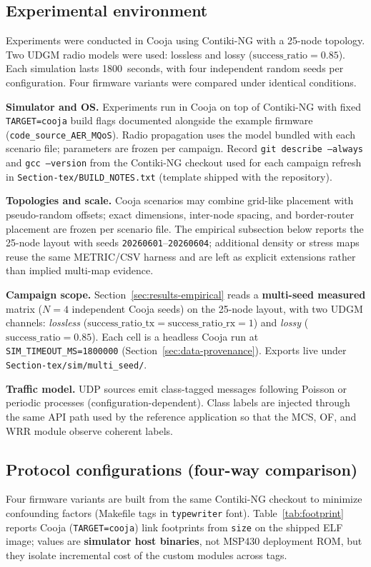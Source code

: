 \subsection{Experimental environment}
Experiments were conducted in Cooja using Contiki-NG with a 25-node topology. Two UDGM radio models were used: lossless and lossy ($\mathrm{success\_ratio}{=}0.85$). Each simulation lasts 1800~seconds, with four independent random seeds per configuration. Four firmware variants were compared under identical conditions.

\textbf{Simulator and OS.} Experiments run in Cooja on top of Contiki-NG with fixed \texttt{TARGET=cooja} build flags documented alongside the example firmware (\texttt{code\_source\_AER\_MQoS}). Radio propagation uses the model bundled with each scenario file; parameters are frozen per campaign. Record \texttt{git describe --always} and \texttt{gcc --version} from the Contiki-NG checkout used for each campaign refresh in \texttt{Section-tex/BUILD\_NOTES.txt} (template shipped with the repository).

\textbf{Topologies and scale.} Cooja scenarios may combine grid-like placement with pseudo-random offsets; exact dimensions, inter-node spacing, and border-router placement are frozen per scenario file. The empirical subsection below reports the 25-node layout with seeds \texttt{20260601}--\texttt{20260604}; additional density or stress maps reuse the same METRIC/CSV harness and are left as explicit extensions rather than implied multi-map evidence.

\textbf{Campaign scope.} Section~\ref{sec:results-empirical} reads a \textbf{multi-seed measured} matrix ($N{=}4$ independent Cooja seeds) on the 25-node layout, with two UDGM channels: \emph{lossless} ($\mathrm{success\_ratio\_tx}{=}\mathrm{success\_ratio\_rx}{=}1$) and \emph{lossy} ($\mathrm{success\_ratio}{=}0.85$). Each cell is a headless Cooja run at \texttt{SIM\_TIMEOUT\_MS=1800000} (Section~\ref{sec:data-provenance}). Exports live under \texttt{Section-tex/sim/multi\_seed/}.

\textbf{Traffic model.} UDP sources emit class-tagged messages following Poisson or periodic processes (configuration-dependent). Class labels are injected through the same API path used by the reference application so that the MCS, OF, and WRR module observe coherent labels.

\subsection{Protocol configurations (four-way comparison)}
Four firmware variants are built from the same Contiki-NG checkout to minimize confounding factors (Makefile tags in \texttt{typewriter} font). Table~\ref{tab:footprint} reports Cooja (\texttt{TARGET=cooja}) link footprints from \texttt{size} on the shipped ELF image; values are \textbf{simulator host binaries}, not MSP430 deployment ROM, but they isolate incremental cost of the custom modules across tags.

